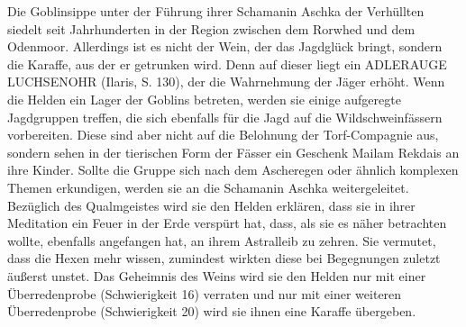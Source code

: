 

Die Goblinsippe unter der Führung ihrer Schamanin Aschka der Verhüllten siedelt seit Jahrhunderten in der Region zwischen dem Rorwhed und dem Odenmoor.
Allerdings ist es nicht der Wein, der das Jagdglück bringt, sondern die Karaffe, aus der er getrunken wird. Denn auf dieser liegt ein ADLERAUGE LUCHSENOHR (Ilaris, S. 130), der die Wahrnehmung der Jäger erhöht.
Wenn die Helden ein Lager der Goblins betreten, werden sie einige aufgeregte Jagdgruppen treffen, die sich ebenfalls für die Jagd auf die Wildschweinfässern vorbereiten. Diese sind aber nicht auf die Belohnung der Torf-Compagnie aus, sondern sehen in der tierischen Form der Fässer ein Geschenk Mailam Rekdais an ihre Kinder.
Sollte die Gruppe sich nach dem Ascheregen oder ähnlich komplexen Themen erkundigen, werden sie an die Schamanin Aschka weitergeleitet. Bezüglich des Qualmgeistes wird sie den Helden erklären, dass sie in ihrer Meditation ein Feuer in der Erde verspürt hat, dass, als sie es näher betrachten wollte, ebenfalls angefangen hat, an ihrem Astralleib zu zehren. Sie vermutet, dass die Hexen mehr wissen, zumindest wirkten diese bei Begegnungen zuletzt äußerst unstet.
Das Geheimnis des Weins wird sie den Helden nur mit einer Überredenprobe (Schwierigkeit 16) verraten und nur mit einer weiteren Überredenprobe (Schwierigkeit 20) wird sie ihnen eine Karaffe übergeben.


